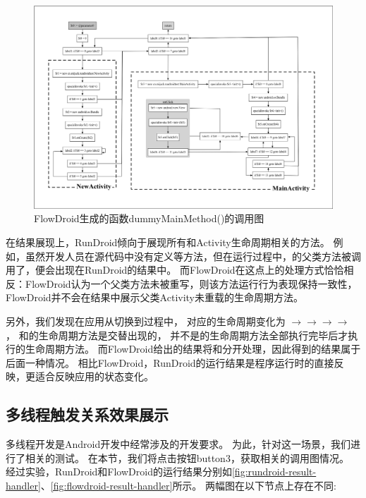 \begin{figure}[ht]
	\centering
	\includegraphics[width=\textwidth]{./Figures/flowdroid-dummyMainMethod.png}
	\caption{FlowDroid生成的函数dummyMainMethod()的调用图}
	\label{fig:flowdroid-result-lifecycle}
\end{figure}

在结果展现上，RunDroid倾向于展现所有和Activity生命周期相关的方法。
例如，虽然开发人员在源代码中没有定义等方法，但在运行过程中，的父类方法被调用了，便会出现在RunDroid的结果中。
而FlowDroid在这点上的处理方式恰恰相反：FlowDroid认为一个父类方法未被重写，则该方法运行行为表现保持一致性，FlowDroid并不会在结果中展示父类Activity未重载的生命周期方法。



另外，我们发现在应用从切换到过程中，
对应的生命周期变化为 $\to$$\to$$\to$$\to$ ，
和的生命周期方法是交替出现的，
并不是的生命周期方法全部执行完毕后才执行的生命周期方法。
而FlowDroid给出的结果将和分开处理，因此得到的结果属于后面一种情况。
相比FlowDroid，RunDroid的运行结果是程序运行时的直接反映，更适合反映应用的状态变化。


\subsection{多线程触发关系效果展示}

多线程开发是Android开发中经常涉及的开发要求。
为此，针对这一场景，我们进行了相关的测试。
在本节，我们将点击按钮button3，获取相关的调用图情况。
经过实验，RunDroid和FlowDroid的运行结果分别如\autoref{fig:rundroid-result-handler}、\autoref{fig:flowdroid-result-handler}所示。
两幅图在以下节点上存在不同:





